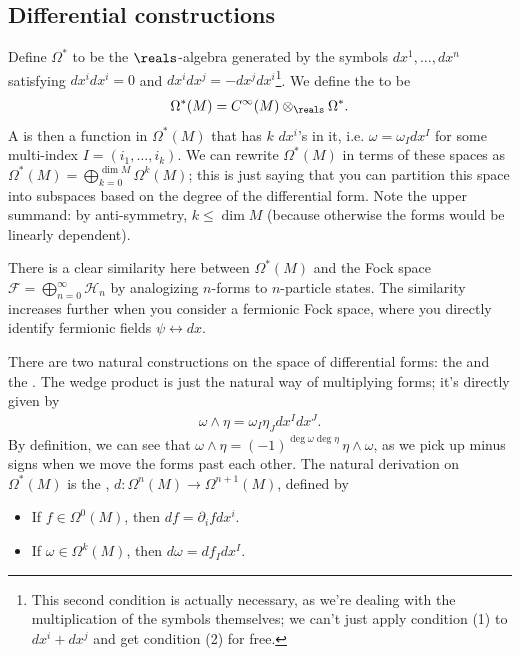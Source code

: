 \documentclass[11pt]{article}
\begin{document}
\subsection{Differential constructions}

Define $\Omega^*$ to be the $\reals$-algebra generated by the symbols
$dx^1, \ldots, dx^n$ satisfying $dx^i dx^i = 0$ and
$dx^i dx^j = - dx^j dx^i$\footnote{This second condition is
actually necessary, as we're dealing with the multiplication of
the symbols themselves; we can't just apply condition (1)
to $dx^i + dx^j$ and get condition (2) for free.}. We define the
 to be
\begin{align*}
    \Omega^*(M) = C^\infty(M) \otimes_\reals \Omega^*.
\end{align*}
A  is then a function in $\Omega^*(M)$
that has $k$ $dx^i$'s in it, i.e. $\omega = \omega_I dx^I$
for some multi-index $I = (i_1, \ldots, i_k)$. We can rewrite $\Omega^*(M)$
in terms of these spaces as $\Omega^*(M) = \bigoplus_{k = 0}^{\dim{M}} \Omega^k(M)$;
this is just saying that you can partition this space into subspaces
based on the degree of the differential form. Note the upper summand: by
anti-symmetry, $k \leq \dim{M}$ (because otherwise the forms would be
linearly dependent).

\begin{reemark}
    There is a clear similarity here between $\Omega^*(M)$ and the Fock
    space $\mathcal{F} = \bigoplus_{n = 0}^{\infty} \mathcal{H}_n$
    by analogizing $n$-forms to $n$-particle states. The similarity increases
    further when you consider a fermionic Fock space, where you directly
    identify fermionic fields $\psi \leftrightarrow dx$.
\end{reemark}

There are two natural constructions on the space of differential forms: the
 and the . The wedge product is
just the natural way of multiplying forms; it's directly given by
\begin{align*}
    \boxed{\omega \wedge \eta = \omega_I \eta_J dx^I dx^J.}
\end{align*}
By definition, we can see that
$\omega \wedge \eta = (-1)^{\deg{\omega} \deg{\eta}} \, \eta \wedge \omega$,
as we pick up minus signs when we move the forms past each other.
The natural derivation on $\Omega^*(M)$ is the ,
$d \colon \Omega^n(M) \to \Omega^{n+1}(M)$, defined by
\begin{itemize}
    \item If $f \in \Omega^0(M)$, then $df = \partial_i f dx^i$.
    \item If $\omega \in \Omega^k(M)$, then $d\omega = df_I dx^I$.
\end{itemize}
\end{document}
